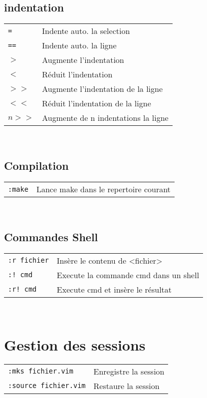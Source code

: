\documentclass[8pt,landscape,a4paper]{article}
\begin{document}
\begin{multicols*}{3}
    \subsection{indentation}
    \begin{tabular}{m{2cm} l}
        \texttt{=}  & Indente auto. la selection\\
        \texttt{==} & Indente auto. la ligne\\
        \texttt{$>$}  & Augmente l'indentation \\
        \texttt{$<$}  & Réduit l'indentation \\
        \texttt{$>>$} & Augmente l'indentation de la ligne\\
        \texttt{$<<$} & Réduit l'indentation de la ligne\\
        \texttt{$n>>$} & Augmente de n indentations la ligne\\
    \end{tabular}\\
    \subsection{Compilation}
    \begin{tabular}{m{2cm} l}
        \texttt{:make}  & Lance make dans le repertoire courant\\
    \end{tabular}\\
    \subsection{Commandes Shell}
    \begin{tabular}{m{2cm} l}
        \texttt{:r fichier} & Insère le contenu de <fichier> \\
        \texttt{:! cmd}  & Execute la commande cmd dans un shell\\
        \texttt{:r! cmd} & Execute cmd et insère le résultat \\
    \end{tabular}\\

    \section{Gestion des sessions}
    \begin{tabular}{m{4cm} l}
        \texttt{:mks fichier.vim} & Enregistre la session\\
        \texttt{:source fichier.vim} & Restaure la session\\
    \end{tabular}\\
    

\end{multicols*}
\end{document}
